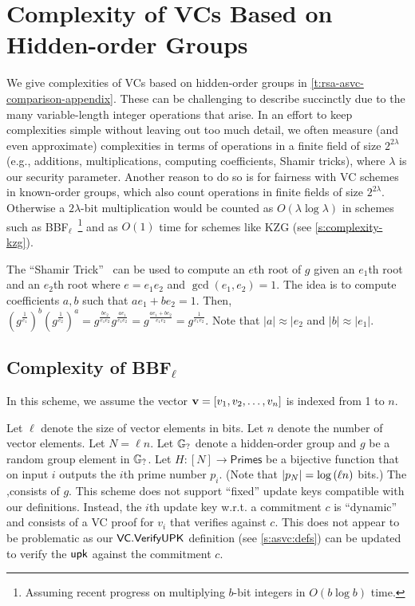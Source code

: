 \section{Complexity of VCs Based on Hidden-order Groups}
\label{s:complexity:hog}


We give complexities of VCs based on hidden-order groups in \cref{t:rsa-asvc-comparison-appendix}.
These can be challenging to describe succinctly due to the many variable-length integer operations that arise.
In an effort to keep complexities simple without leaving out too much detail, we often measure (and even approximate) complexities in terms of operations in a finite field of size $2^{2\lambda}$ (e.g., additions, multiplications, computing \bezout coefficients, Shamir tricks), where $\lambda$ is our security parameter.
Another reason to do so is for fairness with VC schemes in known-order groups, which also count operations in finite fields of size $2^{2\lambda}$.
Otherwise a $2\lambda$-bit multiplication would be counted as $O(\lambda \log\lambda)$ in schemes such as BBF$_\ell$~\cite{BBF18}\footnote{Assuming recent progress on multiplying $b$-bit integers in $O(b\log{b})$ time.} and as $O(1)$ time for schemes like KZG (see \cref{s:complexity-kzg}).

The ``Shamir Trick''~\cite{Shamir83,BBF18} can be used to compute an $e$th root of $g$ given an $e_1$th root and an $e_2$th root where $e=e_1 e_2$ and $\gcd(e_1,e_2)=1$.
The idea is to compute \bezout coefficients $a,b$ such that $a e_1 + b e_2 = 1$.
Then, $\left(g^\frac{1}{e_1}\right)^b \left(g^\frac{1}{e_2}\right)^a=g^\frac{b e_2}{e_1 e_2} g^\frac{a e_1}{e_1 e_2} = g^\frac{a e_1 + b e_2}{e_1 e_2} = g^\frac{1}{e_1 e_2}$.
Note that $|a|\approx|e_2$ and $|b|\approx|e_1|$.

\subsection{Complexity of BBF$_\ell$~\cite{BBF18,BBF19}}
\label{s:complexity-bbf}
In this scheme, we assume the vector $\bm{\mathrm{v}}=[v_1, v_2, \dots, v_n]$ is indexed from 1 to $n$.

Let $\ell$ denote the size of vector elements in bits.
Let $n$ denote the number of vector elements.
Let $N=\ell n$.
Let $\mathbb{G}_{?}$ denote a hidden-order group and $g$ be a random group element in $\mathbb{G}_{?}$.
Let $H : [N] \rightarrow \mathsf{Primes}$ be a bijective function that on input $i$ outputs the $i$th prime number $p_i$.
(Note that $|p_N|=\log{(\ell n)}$ bits.)
The \prk,\vrk consists of $g$.
This scheme does not support ``fixed'' update keys compatible with our definitions.
Instead, the $i$th update key w.r.t. a commitment $c$ is ``dynamic'' and consists of a VC proof for $v_i$ that verifies against $c$.
This does not appear to be problematic as our $\mathsf{VC}.\mathsf{VerifyUPK}$ definition (see \cref{s:asvc:defs}) can be updated to verify the $\mathsf{upk}$ against the commitment $c$.

